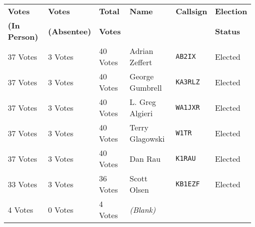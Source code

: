 \documentclass[10pt,letterpaper]{article}
\begin{document}
\begin{enumerate}
  \begin{tabular}{|p{1in}|p{.75in}|p{.6in}|p{1.2in}|p{.75in}|p{.75in}|}
  \hline
  \textbf{Votes}       & \textbf{Votes}      & \textbf{Total} & \textbf{Name} & \textbf{Callsign} & \textbf{Election} \\
  \textbf{(In Person)} & \textbf{(Absentee)} & \textbf{Votes} &               &                   & \textbf{Status}   \\ \hline
  37 Votes & 3 Votes & 40 Votes & Adrian Zeffert & \texttt{AB2IX} & Elected \\ \hline
  37 Votes & 3 Votes & 40 Votes & George Gumbrell & \texttt{KA3RLZ} & Elected \\ \hline
  37 Votes & 3 Votes & 40 Votes & L. Greg Algieri & \texttt{WA1JXR} & Elected \\ \hline
  37 Votes & 3 Votes & 40 Votes & Terry Glagowski & \texttt{W1TR} & Elected \\ \hline
  37 Votes & 3 Votes & 40 Votes & Dan Rau & \texttt{K1RAU} & Elected \\ \hline
  33 Votes & 3 Votes & 36 Votes & Scott Olsen & \texttt{KB1EZF} & Elected \\ \hline
  4 Votes & 0 Votes & 4 Votes & \emph{(Blank)} & & \\ \hline
  \end{tabular}
\end{enumerate}
\end{document}
